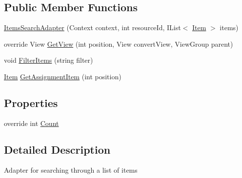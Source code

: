 \subsection*{Public Member Functions}
\begin{DoxyCompactItemize}
\item 
\hyperlink{class_field_service_1_1_android_1_1_items_search_adapter_a2cd2c0c5d4af5f6bd38f3ea0e3b892fe}{Items\+Search\+Adapter} (Context context, int resource\+Id, I\+List$<$ \hyperlink{class_field_service_1_1_data_1_1_item}{Item} $>$ items)
\item 
override View \hyperlink{class_field_service_1_1_android_1_1_items_search_adapter_ac8957fbe613513ac304b4bf97061c609}{Get\+View} (int position, View convert\+View, View\+Group parent)
\item 
void \hyperlink{class_field_service_1_1_android_1_1_items_search_adapter_ace4d94df90aa4456eadfb810253f1e5e}{Filter\+Items} (string filter)
\item 
\hyperlink{class_field_service_1_1_data_1_1_item}{Item} \hyperlink{class_field_service_1_1_android_1_1_items_search_adapter_a8f79210676f0b7149ab3f15c733184a0}{Get\+Assignment\+Item} (int position)
\end{DoxyCompactItemize}
\subsection*{Properties}
\begin{DoxyCompactItemize}
\item 
override int \hyperlink{class_field_service_1_1_android_1_1_items_search_adapter_a6374e8104b50f4a24c637404774a109b}{Count}
\end{DoxyCompactItemize}


\subsection{Detailed Description}
Adapter for searching through a list of items 



